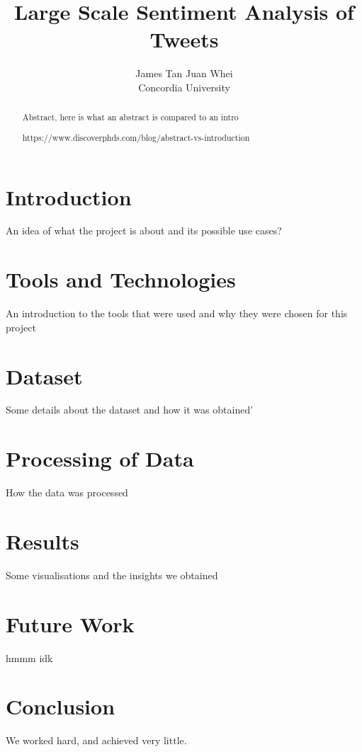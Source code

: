 \documentclass[a4paper,12pt]{article}
\begin{document}
\title{Large Scale Sentiment Analysis of Tweets }%
\author{
	James Tan Juan Whei\\
	Concordia University
}  
\maketitle

\begin{abstract}
Abstract, here is what an abstract is compared to an intro

https://www.discoverphds.com/blog/abstract-vs-introduction
\end{abstract}

\section{Introduction}

An idea of what the project is about and its possible use cases?

\section{Tools and Technologies}
An introduction to the tools that were used and why they were chosen for this project

\section{Dataset}
Some details about the dataset and how it was obtained'

\section{Processing of Data}
How the data was processed

\section{Results}
Some visualisations and the insights we obtained

\section{Future Work}
hmmm idk

\section{Conclusion}
We worked hard, and achieved very little.

\nocite{*}



\end{document}
